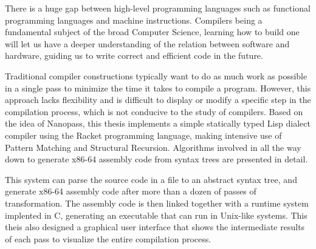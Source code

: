 \begin{abstract*}

\begin{comment}
  This is a sample document of HFUT thesis \LaTeX{} template for bachelor,
  master and doctor. The template is created by \href{https://github.com/LaureatePoet}{LaureatePoet} and \href{https://github.com/HowardZorn}{Fw[a]rd}. The
  template meets the equirements of HFUT thesis writing standards.

  This document will show the usage of basic commands provided by \LaTeX{} and
  some features provided by the template. For more information, please refer to
  the template document hfutthesis-doc.pdf.
\end{comment}

  \noindent %
There is a huge gap between high-level programming languages
such as functional programming languages and machine instructions.
Compilers being a fundamental subject of the broad Computer Science,
learning how to build one will let us have a deeper understanding
of the relation between software and hardware,
guiding us to write correct and efficient code in the future.

Traditional compiler constructions typically want to do
as much work as possible in a single pass to minimize the time
it takes to compile a program. However, this approach lacks flexibility
and is difficult to display or modify a specific step in the
compilation process, which is not conducive to the study of compilers.
Based on the idea of Nanopass, this thesis implements
a simple statically typed Lisp dialect compiler
using the Racket programming language,
making intensive use of Pattern Matching and Structural Recursion.
Algorithms involved in all the way down to generate x86-64 assembly code
from syntax trees are presented in detail.

This system can parse the source code in a file to an abstract syntax tree,
and generate x86-64 assembly code after more than a dozen of passes of transformation.
The assembly code is then linked together with a runtime system implented in C,
generating an executable that can run in Unix-like systems.
This theis also designed a graphical user interface that shows
the intermediate results of each pass to visualize the entire compilation process.

\end{abstract*}
